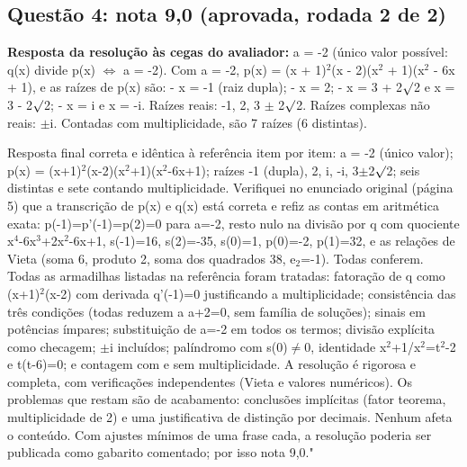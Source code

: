 \documentclass{article}%
\begin{document}
\subsection*{Questão 4: nota 9,0 (aprovada, rodada 2 de 2)}%
\textbf{Resposta da resolução às cegas do avaliador:} a = -2 (único valor possível: q(x) divide p(x) $\Leftrightarrow$ a = -2).\newline%
\newline%
Com a = -2, p(x) = (x + 1)$^2$(x - 2)(x$^2$ + 1)(x$^2$ - 6x + 1), e as raízes de p(x) são:\newline%
{-} x = -1 (raiz dupla);\newline%
{-} x = 2;\newline%
{-} x = 3 + 2$\surd$2 e x = 3 - 2$\surd$2;\newline%
{-} x = i e x = -i.\newline%
\newline%
Raízes reais: -1, 2, 3 $\pm$ 2$\surd$2. Raízes complexas não reais: $\pm$i. Contadas com multiplicidade, são 7 raízes (6 distintas).\par %
Resposta final correta e idêntica à referência item por item: a = -2 (único valor); p(x) = (x+1)$^2$(x-2)(x$^2$+1)(x$^2$-6x+1); raízes -1 (dupla), 2, i, -i, 3$\pm$2$\surd$2; seis distintas e sete contando multiplicidade. Verifiquei no enunciado original (página 5) que a transcrição de p(x) e q(x) está correta e refiz as contas em aritmética exata: p(-1)=p'(-1)=p(2)=0 para a=-2, resto nulo na divisão por q com quociente x$^{4}$-6x$^3$+2x$^2$-6x+1, s(-1)=16, s(2)=-35, s(0)=1, p(0)=-2, p(1)=32, e as relações de Vieta (soma 6, produto 2, soma dos quadrados 38, e$_{2}$=-1). Todas conferem. Todas as armadilhas listadas na referência foram tratadas: fatoração de q como (x+1)$^2$(x-2) com derivada q'(-1)=0 justificando a multiplicidade; consistência das três condições (todas reduzem a a+2=0, sem família de soluções); sinais em potências ímpares; substituição de a=-2 em todos os termos; divisão explícita como checagem; $\pm$i incluídos; palíndromo com s(0)$\neq$0, identidade x$^2$+1/x$^2$=t$^2$-2 e t(t-6)=0; e contagem com e sem multiplicidade. A resolução é rigorosa e completa, com verificações independentes (Vieta e valores numéricos). Os problemas que restam são de acabamento: conclusões implícitas (fator teorema, multiplicidade de 2) e uma justificativa de distinção por decimais. Nenhum afeta o conteúdo. Com ajustes mínimos de uma frase cada, a resolução poderia ser publicada como gabarito comentado; por isso nota 9,0."%
\end{document}
